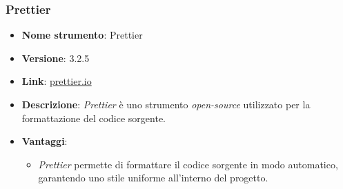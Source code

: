\subsubsection{Prettier}
\begin{itemize}
      \item \textbf{Nome strumento}: Prettier
      \item \textbf{Versione}: 3.2.5
      \item \textbf{Link}: \href{https://prettier.io/}{prettier.io}
      \item \textbf{Descrizione}: \textit{Prettier} è uno strumento \textit{open-source} utilizzato per la formattazione del codice sorgente.
      \item \textbf{Vantaggi}:
            \begin{itemize}
                  \item \textit{Prettier} permette di formattare il codice sorgente in modo automatico, garantendo uno stile uniforme all'interno del progetto.
            \end{itemize}
\end{itemize}

